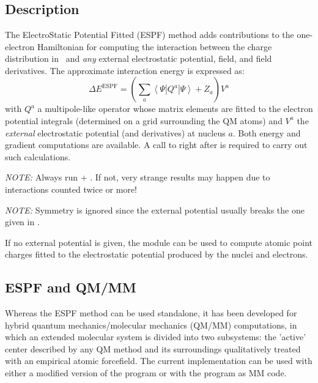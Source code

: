 \section{}
\label{UG:sec:espf}

\subsection{Description}
\label{UG:sec:espf_description}

The ElectroStatic Potential Fitted (ESPF) method adds contributions to the one-electron Hamiltonian for computing the interaction between the charge distribution in \molcas\ and \emph{any} external electrostatic potential, field, and field derivatives. The approximate interaction energy is expressed as:
\begin{equation}
\Delta E^{\mathrm{ESPF}} = \left ( \sum_a \left < \Psi\left |Q^a\right| \Psi \right > + Z_a \right ) V^a
\end{equation}
with $Q^a$ a multipole-like operator whose matrix elements are fitted to the electron potential integrals (determined on a grid surrounding the QM atoms) and $V^a$ the \emph{external} electrostatic potential (and derivatives) at nucleus $a$. Both energy and gradient computations are available. A call to  right after  is required to carry out such calculations.

\emph{NOTE:} Always run  + . If not, very strange results may happen due to interactions counted twice or more!

\emph{NOTE:} Symmetry is ignored since the external potential usually breaks the one given in .

If no external potential is given, the  module can be used to compute atomic point charges fitted to the electrostatic potential produced by the nuclei and electrons.

\subsection{ESPF and QM/MM}
Whereas the ESPF method can be used standalone, it has been developed for hybrid quantum mechanics/molecular mechanics (QM/MM) computations, in which an extended molecular system is divided into two subsystems: the 'active' center described by any QM method and its surroundings qualitatively treated with an empirical atomic forcefield. The current implementation can be used with either a modified version of the  program or with the  program as MM code.

